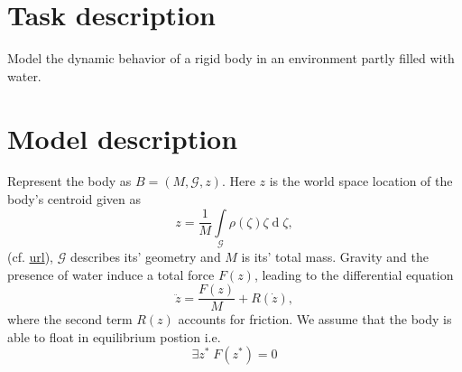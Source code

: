 
\tableofcontents
\section{Task description}
Model the dynamic behavior of a rigid body in an environment partly filled with water.

\section{Model description}
Represent the body as $B = \left(M, \mathcal{G}, z\right)$.  Here $z$ is the world space location of the body's centroid given as
$$z = \frac{1}{M} \int\limits_{\mathcal{G}} \rho(\zeta) \zeta \operatorname{d} \zeta, $$
(cf.  \href{http://en.wikipedia.org/w/index.php?title=Center\_of\_mass&action=edit&section=4}{url}),
$\mathcal{G}$ describes its' geometry and $M$ is its' total mass. 
Gravity and the presence of water induce a total force $F(z)$, leading to the differential equation
\begin{equation}
\ddot{z} = \frac{F(z)}{M} + R(\dot{z}),  
\label{eq:eom}
\end{equation}
where the second term $R(z)$ accounts for friction.
We assume that the body is able to float in equilibrium postion i.e.
$$\exists z^* \; F(z^*) = 0$$

